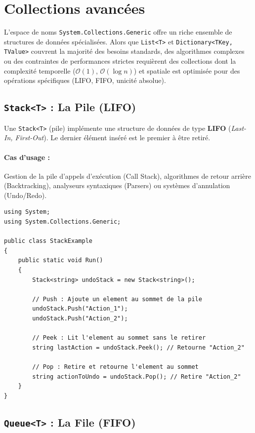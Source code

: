 \section{Collections avancées}

L'espace de noms \texttt{System.Collections.Generic} offre un riche ensemble de structures de données spécialisées. Alors que \texttt{List<T>} et \texttt{Dictionary<TKey, TValue>} couvrent la majorité des besoins standards, des algorithmes complexes ou des contraintes de performances strictes requièrent des collections dont la complexité temporelle ($\mathcal{O}(1)$, $\mathcal{O}(\log n)$) et spatiale est optimisée pour des opérations spécifiques (LIFO, FIFO, unicité absolue).

\subsection{\texttt{Stack<T>} : La Pile (LIFO)}

Une \texttt{Stack<T>} (pile) implémente une structure de données de type \textbf{LIFO} (\textit{Last-In, First-Out}). Le dernier élément inséré est le premier à être retiré.

\paragraph{Cas d'usage :} Gestion de la pile d'appels d'exécution (Call Stack), algorithmes de retour arrière (Backtracking), analyseurs syntaxiques (Parsers) ou systèmes d'annulation (Undo/Redo).

\begin{lstlisting}[language={[Sharp]C}]
using System;
using System.Collections.Generic;

public class StackExample
{
    public static void Run()
    {
        Stack<string> undoStack = new Stack<string>();
        
        // Push : Ajoute un element au sommet de la pile
        undoStack.Push("Action_1");
        undoStack.Push("Action_2");
        
        // Peek : Lit l'element au sommet sans le retirer
        string lastAction = undoStack.Peek(); // Retourne "Action_2"
        
        // Pop : Retire et retourne l'element au sommet
        string actionToUndo = undoStack.Pop(); // Retire "Action_2"
    }
}
\end{lstlisting}

\subsection{\texttt{Queue<T>} : La File (FIFO)}

